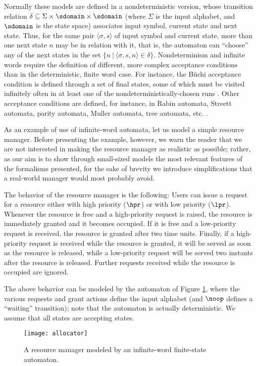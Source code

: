 Normally these models are defined in a nondeterministic version, 
whose transition relation $\delta \subseteq \Sigma \times \sdomain \times \sdomain$
(where $\Sigma$ is the input alphabet, and $\sdomain$ is the state space) associates
input symbol, current state and next state. 
Thus, for the same pair $\langle \sigma, s \rangle$ of input symbol and current state,
more than one next state $n$ may be in relation with it, that is, the automaton can ``choose'' 
any of the next states in the set $\{n \:|\: \langle \sigma, s, n \rangle \in \delta \}$.
Nondeterminism and infinite words require the definition of different, 
more complex acceptance conditions than in the deterministic, 
finite word case. For instance, the B\"uchi acceptance condition 
is defined through a set of final states, some of which must 
be visited infinitely often in at least one of the nondeterministically-chosen 
runs \cite{Var96}. Other acceptance conditions are defined, for instance, 
in Rabin automata, Streett automata, parity automata, Muller 
automata, tree automata, etc. \cite{Tho90}.

As an example of use of infinite-word automata, let us model 
a simple resource manager. Before presenting the example, however, 
we warn the reader that we are not interested in making the resource 
manager as realistic as possible; rather, as our aim is to show 
through small-sized models the most relevant features of the 
formalisms presented, for the sake of brevity we introduce simplifications 
that a real-world manager would most probably avoid.

The behavior of the resource manager is the following: Users 
can issue a request for a resource either with high priority 
($\hpr$) or with low priority ($\lpr$). Whenever the resource 
is free and a high-priority request is raised, the resource is 
immediately granted and it becomes occupied. If it is free and 
a low-priority request is received, the resource is granted after 
two time units. Finally, if a high-priority request is received 
while the resource is granted, it will be served as soon as the 
resource is released, while a low-priority request will be served 
two instants after the resource is released. Further requests 
received while the resource is occupied are ignored.

The above behavior can be modeled by the automaton of Figure \ref{fig:allocator}, 
where the various requests and grant actions define the input 
alphabet (and $\noop$ defines a ``waiting'' transition); note 
that the automaton is actually deterministic. We assume that 
all states are accepting states.
\begin{figure}[htb!]
	 \centering
	 \texttt{[image: allocator]}
	 \caption{A resource manager modeled by an infinite-word finite-state automaton.}
	 \label{fig:allocator}
\end{figure}

